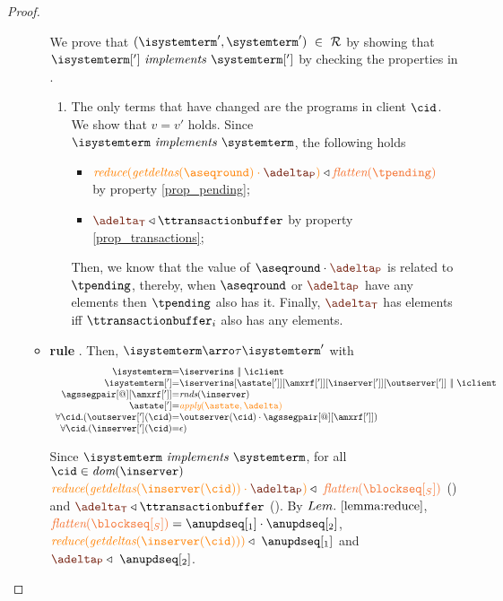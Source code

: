 \begin{proof}
\begin{itemize}
\begin{itemize}
				We  prove that $(\isystemterm',\systemterm') \ \in \ \mathcal{R}$ by showing that $\implements{\isystemterm[']}{\systemterm[']}$ 
				by checking the properties in .			
					\begin{enumerate}
						\item The only terms that have changed are the programs in client $\cid$.  We show that $v=v'$ holds. Since 
						$\implements{\isystemterm}{\systemterm}$, the following holds
						\begin{itemize}
							\item $\ireduce{\igetdeltas{\pending}\cdot{\pushbuffer}}\triangleleft \flatten{\tpending} \ $ by property \ref{prop_pending};
							\item $\transactionbuffer \triangleleft{\ttransactionbuffer}$ by property \ref{prop_transactions};
						\end{itemize}
						Then, we know that the value of $\pending \cdot \pushbuffer$ is related to $\tpending$, thereby, when $\pending$ or $\pushbuffer$ have any elements then $\tpending$ also has it. Finally, $\transactionbuffer$ has elements iff $\ttransactionbuffer_i$ also has any elements.
			
					\end{enumerate}
	
	
	
	
	
	\item {\bf rule }. Then, $\isystemterm  \arroi{\tau} \isystemterm '$ with 
				\[\begin{array}{r@{=}l}
					\isystemterm & \iserverins\ \bigpar \ \iclient
					\\
					\isystemterm['] & {\iserverins[{\astate[']}][{\amxrf[{'}]}][{\inserver[']}][{\outserver[']}]}\ \bigpar \ \iclient \\
					\agssegpair[@][{\amxrf[{'}]}] &\receiveroundsname{\inserver} \\ %
					\astate[']&\iapply{\astate}{\adelta} \\
					\forall\cid.(\outserver['] (\cid)& \outserver(\cid)\cdot\agssegpair[@][{\amxrf[{'}]}]) \\
					\forall\cid.(\inserver['](\cid) & \epsilon)
				  \end{array}
				\]
				
				

				Since $\implements{\isystemterm}{\systemterm}$, for all $\cid \in\dom{\inserver}$
				$\ireduce{\igetdeltas{\inserver(\cid)}\cdot {\pushbuffer}} \triangleleft \ \flatten{\tsent}$ () 
				and  $\transactionbuffer \triangleleft{\ttransactionbuffer}$ (). 
				By $\lemref{lemma:reduce}$, $\flatten{\tsent} = \anupdseq[_1]\cdot\anupdseq[_2]$, 
				$\ireduce{\igetdeltas{\inserver(\cid)}} \triangleleft \ \anupdseq[_1]$ and $ {\pushbuffer}  \triangleleft \ \anupdseq[_2]$. 
			


\end{itemize}
\end{itemize}
\end{proof}
